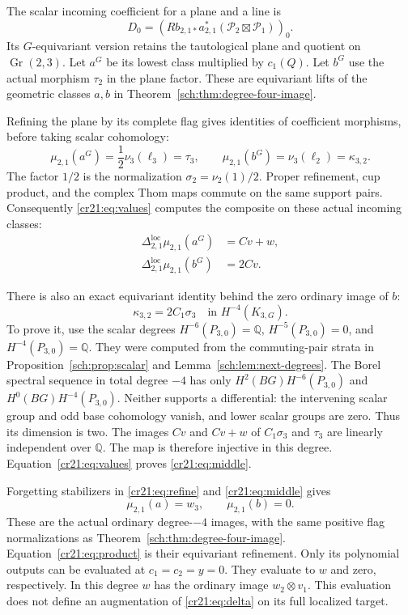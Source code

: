 The scalar incoming coefficient for a plane and a line is
\[
 D_0=\left(Rb_{2,1*}a_{2,1}^*
       (\mathcal P_2\boxtimes\mathcal P_1)\right)_0.
\]
Its $G$-equivariant version retains the tautological plane and quotient
on $\operatorname{Gr}(2,3)$.
Let $a^G$ be its lowest class multiplied by $c_1(Q)$.
Let $b^G$ use the actual morphism $\tau_2$ in the plane factor.
These are equivariant lifts of the geometric classes $a,b$ in
Theorem~\ref{sch:thm:degree-four-image}.

Refining the plane by its complete flag gives identities of coefficient
morphisms, before taking scalar cohomology:
\begin{equation}
 \mu_{2,1}(a^G)=\frac12\nu_3(\ell_3)=\tau_3,
 \qquad \mu_{2,1}(b^G)=\nu_3(\ell_2)=\kappa_{3,2}.
 \label{cr21:eq:refine}
\end{equation}
The factor $1/2$ is the normalization $\sigma_2=\nu_2(1)/2$.
Proper refinement, cup product, and the complex Thom maps commute
on the same support pairs.
Consequently \eqref{cr21:eq:values} computes the composite on these
actual incoming classes:
\begin{equation}
 \begin{aligned}
 \Delta_{2,1}^{\mathrm{loc}}\mu_{2,1}(a^G)&=Cv+w,\\
 \Delta_{2,1}^{\mathrm{loc}}\mu_{2,1}(b^G)&=2Cv.
 \end{aligned}
 \label{cr21:eq:product}
\end{equation}

There is also an exact equivariant identity behind the zero ordinary
image of $b$:
\begin{equation}
 \kappa_{3,2}=2C_1\sigma_3
          \quad\text{in }H^{-4}(K_{3,G}).
 \label{cr21:eq:middle}
\end{equation}
To prove it, use the scalar degrees
$H^{-6}(P_{3,0})=\mathbb Q$, $H^{-5}(P_{3,0})=0$, and
$H^{-4}(P_{3,0})=\mathbb Q$.
They were computed from the commuting-pair strata in
Proposition~\ref{sch:prop:scalar} and
Lemma~\ref{sch:lem:next-degrees}.
The Borel spectral sequence in total degree $-4$ has only
$H^2(BG)H^{-6}(P_{3,0})$ and $H^0(BG)H^{-4}(P_{3,0})$.
Neither supports a differential: the intervening scalar group and
odd base cohomology vanish, and lower scalar groups are zero.
Thus its dimension is two.
The images $Cv$ and $Cv+w$ of $C_1\sigma_3$ and $\tau_3$
are linearly independent over $\mathbb Q$.
The map is therefore injective in this degree.
Equation~\eqref{cr21:eq:values} proves \eqref{cr21:eq:middle}.

Forgetting stabilizers in \eqref{cr21:eq:refine} and
\eqref{cr21:eq:middle} gives
\[
 \mu_{2,1}(a)=w_3,\qquad \mu_{2,1}(b)=0.
\]
These are the actual ordinary degree-$-4$ images, with the same
positive flag normalizations as Theorem~\ref{sch:thm:degree-four-image}.
Equation~\eqref{cr21:eq:product} is their equivariant refinement.
Only its polynomial outputs can be evaluated at $c_1=c_2=y=0$.
They evaluate to $w$ and zero, respectively.
In this degree $w$ has the ordinary image $w_2\otimes v_1$.
This evaluation does not define an augmentation of
\eqref{cr21:eq:delta} on its full localized target.

